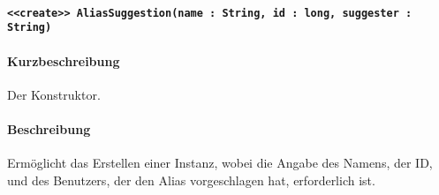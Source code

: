 \paragraph{\texttt{<<create>> AliasSuggestion(name : String, id : long, suggester : String)}}%
\paragraph*{Kurzbeschreibung}
Der Konstruktor.
\paragraph*{Beschreibung}
Ermöglicht das Erstellen einer Instanz, wobei die Angabe des Namens, der ID, und des Benutzers, der den Alias vorgeschlagen hat, erforderlich ist.

